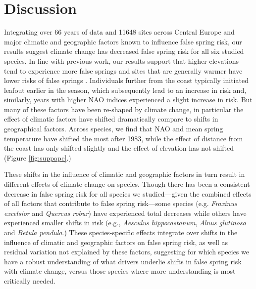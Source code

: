 \documentclass{article}\usepackage[]{graphicx}\usepackage[]{color}
\begin{document}
\section*{Discussion}
Integrating over 66 years of data and 11648 sites across Central Europe and major climatic and geographic factors known to influence false spring risk, our results suggest climate change has decreased false spring risk for all six studied species. In line with previous work, our results support that higher elevations tend to experience more false springs \citep{Vitasse2018, Vitra2017} and sites that are generally warmer have lower risks of false springs \citep{Wypych2016}. Individuals further from the coast typically initiated leafout earlier in the season, which subsequently lead to an increase in risk and, similarly, years with higher NAO indices experienced a slight increase in risk. But many of these factors have been re-shaped by climate change, in particular the effect of climatic factors have shifted dramatically compare to shifts in geographical factors. Across species, we find that NAO and mean spring temperature have shifted the most after 1983, while the effect of distance from the coast has only shifted slightly and the effect of elevation has not shifted (Figure \ref{fig:suppapc}.) %

These shifts in the influence of climatic and geographic factors in turn result in different effects of climate change on species. Though there has been a consistent decrease in false spring risk for all species we studied---given the combined effects of all factors that contribute to false spring risk---some species (e.g. \textit{Fraxinus excelsior} and \textit{Quercus robur}) have experienced total decreases while others have experienced smaller shifts in risk (e.g., \textit{Aesculus hippocastanum}, \textit{Alnus glutinosa} and \textit{Betula pendula}.) These species-specific effects integrate over shifts in the influence of climatic and geographic factors on false spring risk, as well as residual variation not explained by these factors, suggesting for which species we have a robust understanding of what drivers underlie shifts in false spring risk with climate change, versus those species where more understanding is most critically needed. 
\end{document}
